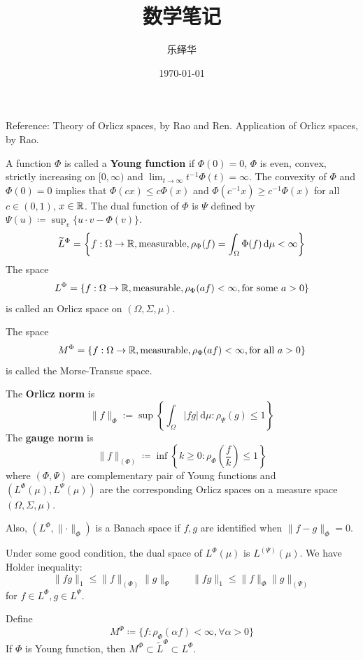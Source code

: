 \documentclass{ctexart}
\author{乐绎华}
\title{数学笔记}
\date{\today}
\let\originalmathbb\mathbb
\renewcommand{\mathbb}[1]{%
    \ifstrequal{#1}{1}{\mathbbm{#1}}{\originalmathbb{#1}}%
}
\theoremstyle{plain}
\theoremstyle{definition}
\theoremstyle{remark}
\begin{document}
\maketitle
\tableofcontents

Reference: Theory of Orlicz spaces, by Rao and Ren. Application of Orlicz spaces, by Rao.

A function $\Phi$ is called a \textbf{Young function} if $\Phi(0)=0$, $\Phi$ is even, convex, strictly increasing on $[0,\infty)$ and $\lim_{ t \to \infty }t^{-1}\Phi(t)=\infty$. The convexity of $\Phi$ and $\Phi(0)=0$ implies that $\Phi (cx)\leq c\Phi (x)$ and $\Phi(c^{-1}x)\geq c^{-1}\Phi(x)$ for all $c\in(0,1)$, $x\in \mathbb{R}$. The dual function of $\Phi$ is $\Psi$ defined by $\Psi(u)\coloneqq \sup_{v} \{ u\cdot v-\Phi(v) \}$.
\[
\widetilde{L}^{\Phi}=\left\{  f:\Omega\to \mathbb{R},\text{measurable},\rho_{\Phi}(f)=\int_{\Omega}^{} \Phi(f) \, \mathrm{d}\mu<\infty   \right\}
\]
The space
\[
L^{\Phi}=\{ f:\Omega\to \mathbb{R},\text{measurable}, \rho_{\Phi}(af)<\infty,\text{for some }a>0 \}
\]
is called an Orlicz space on $(\Omega,\Sigma,\mu)$.

The space
\[
M^{\Phi}=\{ f:\Omega\to \mathbb{R},\text{measurable}, \rho_{\Phi}(af)<\infty,\text{for all }a>0 \}
\]
is called the Morse-Transue space.

The \textbf{Orlicz norm} is
\[
\lVert f \rVert _{\Phi}:=\sup \left\{  \int_{\Omega}^{} \lvert f g\rvert  \, \mathrm{d}\mu   :\rho_{\Psi}(g)\leq 1\right\}
\]
The \textbf{gauge norm} is
\[
\lVert f \rVert _{(\Phi)}\coloneqq \inf \left\{  k\geq0:\rho_{\Phi}\left( \frac{f}{k} \right)\leq 1  \right\}
\]
where $(\Phi,\Psi)$ are complementary pair of Young functions and $(L^{\Phi}(\mu),L^{\Psi}(\mu ))$ are the corresponding Orlicz spaces on a measure space $\left( \Omega,\Sigma,\mu \right)$.

Also, $(L^{\Phi},\lVert \cdot \rVert_{\Phi})$ is a Banach space if $f,g$ are identified when $\lVert f-g \rVert_{\Phi}=0$.

Under some good condition, the dual space of $L^{\Phi}(\mu)$ is $L^{(\Psi)}(\mu)$. We have Holder inequality:
\[
\lVert fg \rVert _{1}\leq \lVert f \rVert _{(\Phi)}\lVert g \rVert _{\Psi}\qquad \lVert fg \rVert _{1}\leq \lVert f \rVert _{\Phi}\lVert g \rVert _{(\Psi)}
\]
for $f\in L^{\Phi}, g\in L^{\Psi}$.

Define
\[
M^{\Phi}\coloneqq \{ f:\rho_{\Phi}(\alpha f)<\infty,\forall \alpha>0 \}
\]
If $\Phi$ is Young function, then $M^{\Phi}\subset \widetilde{L}^{\Phi}\subset L^{\Phi}$.
\end{document}
